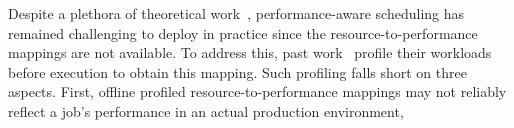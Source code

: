 % 

Despite a plethora of theoretical
work~\citep{demers1989analysis,ghodsi2011dominant,kaneko1979nash,kelly1998rate,gutman2012fair},
performance-aware scheduling has remained challenging to deploy in practice since the resource-to-performance mappings are not available.
% 
% 
To address this, past work~\citep{venkataraman2016ernest,delimitrou2014quasar,zhang2021sinan}
 profile their workloads before execution to obtain
this mapping. Such profiling falls short on three aspects.
First, offline profiled resource-to-performance mappings
 may not reliably reflect a job's performance in an actual production
environment,
